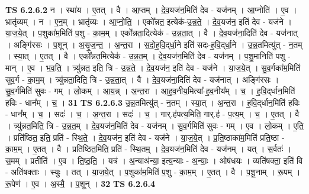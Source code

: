 \documentclass[17pt]{extarticle}
\begin{document}
                  \newline
                                \textbf{ TS 6.2.6.2} \newline
                  न । रथा॑य । ए॒तत् । वै । आ॒प्तम् । दे॒व॒यज॑न॒मिति॑ देव - यज॑नम् । आ॒प्नोति॑ । ए॒व । भ्रातृ॑व्यम् । न । ए॒न॒म् । भ्रातृ॑व्यः । आ॒प्नो॒ति॒ । एको᳚न्नत॒ इत्येक॑-उ॒न्न॒ते॒ । दे॒व॒यज॑न॒ इति॑ देव - यज॑ने । या॒ज॒ये॒त् । प॒शुका॑म॒मिति॑ प॒शु - का॒म॒म् । एको᳚न्नता॒दित्येक॑ - उ॒न्न॒ता॒त् । वै । दे॒व॒यज॑ना॒दिति॑ देव - यज॑नात् । अङ्गि॑रसः । प॒शून् । अ॒सृ॒ज॒न्त॒ । अ॒न्त॒रा । स॒दो॒ह॒वि॒द्‌र्धा॒ने इति॑ सदः-ह॒वि॒द्‌र्धा॒ने । उ॒न्न॒तमित्यु॑त् - न॒तम् । स्या॒त् । ए॒तत् । वै । एको᳚न्नत॒मित्येक॑ - उ॒न्न॒त॒म् । दे॒व॒यज॑न॒मिति॑ देव - यज॑नम् । प॒शु॒मानिति॑ पशु - मान् । ए॒व । भ॒व॒ति॒ । त्र्यु॑न्नत॒ इति॒ त्रि - उ॒न्न॒ते॒ । दे॒व॒यज॑न॒ इति॑ देव - यज॑ने । या॒ज॒ये॒त् । सु॒व॒र्गका॑म॒मिति॑ सुव॒र्ग - का॒म॒म् । त्र्यु॑न्नता॒दिति॒ त्रि - उ॒न्न॒ता॒त् । वै । दे॒व॒यज॑ना॒दिति॑ देव - यज॑नात् । अङ्गि॑रसः । सु॒व॒र्गमिति॑ सुवः - गम् । लो॒कम् । आ॒य॒न्न् । अ॒न्त॒रा । आ॒ह॒व॒नीय॒मित्या᳚-ह॒व॒नीय᳚म् । च॒ । ह॒वि॒द्‌र्धान॒मिति॑ हविः - धान᳚म् । च॒ । \textbf{  31} \newline
                  \newline
                                \textbf{ TS 6.2.6.3} \newline
                  उ॒न्न॒तमित्यु॑त् - न॒तम् । स्या॒त् । अ॒न्त॒रा । ह॒वि॒द्‌र्धान॒मिति॑ हविः - धान᳚म् । च॒ । सदः॑ । च॒ । अ॒न्त॒रा । सदः॑ । च॒ । गार्.ह॑पत्य॒मिति॒ गार्.ह॑ - प॒त्य॒म् । च॒ । ए॒तत् । वै । त्र्यु॑न्नत॒मिति॒ त्रि - उ॒न्न॒त॒म् । दे॒व॒यज॑न॒मिति॑ देव - यज॑नम् । सु॒व॒र्गमिति॑ सुवः - गम् । ए॒व । लो॒कम् । ए॒ति॒ । प्रति॑ष्ठित॒ इति॒ प्रति॑ - स्थि॒ते॒ । दे॒व॒यज॑न॒ इति॑ देव - यज॑ने । या॒ज॒ये॒त् । प्र॒ति॒ष्ठाका॑म॒मिति॑ प्रति॒ष्ठा - का॒म॒म् । ए॒तत् । वै । प्रति॑ष्ठित॒मिति॒ प्रति॑ - स्थि॒तम्॒ । दे॒व॒यज॑न॒मिति॑ देव - यज॑नम् । यत् । स॒र्वतः॑ । स॒मम् । प्रतीति॑ । ए॒व । ति॒ष्ठ॒ति॒ । यत्र॑ । अ॒न्या‌अ॑न्या॒ इत्य॒न्याः - अ॒न्याः॒ । ओष॑धयः । व्यति॑षक्ता॒ इति॑ वि - अति॑षक्ताः । स्युः । तत् । या॒ज॒ये॒त् । प॒शुका॑म॒मिति॑ प॒शु - का॒म॒म् । ए॒तत् । वै । प॒शू॒नाम् । रू॒पम् । रू॒पेण॑ । ए॒व । अ॒स्मै॒ । प॒शून् । \textbf{  32} \newline
                  \newline
                                \textbf{ TS 6.2.6.4} \newline
\end{document}
